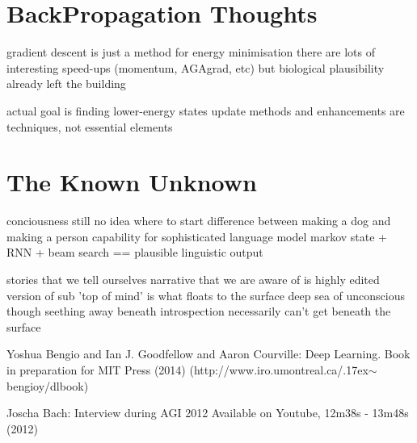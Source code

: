 \documentclass[citeauthoryear]{llncs}
\begin{document}
\section{BackPropagation Thoughts}
  gradient descent is just a method for energy minimisation
    there are lots of interesting speed-ups (momentum, AGAgrad, etc)
      but biological plausibility already left the building
      
    actual goal is finding lower-energy states
      update methods and enhancements are techniques, not essential elements


\section{The Known Unknown}

conciousness 
  still no idea where to start
  difference between making a dog and making a person
    capability for sophisticated language model
      markov state + RNN + beam search == plausible linguistic output
  
  stories that we tell ourselves
    narrative that we are aware of is highly edited version of sub
      'top of mind' is what floats to the surface
      deep sea of unconscious though seething away beneath
  introspection necessarily can't get beneath the surface

%
%
\begin{thebibliography}{}
%
\newcommand{\mytilde}{\raise.17ex\hbox{$\scriptstyle\mathtt{\sim}$}}

Yoshua Bengio and Ian J. Goodfellow and Aaron Courville:
Deep Learning.
Book in preparation for MIT Press (2014)
(http://www.iro.umontreal.ca/\mytilde{}bengioy/dlbook)

Joscha Bach:
Interview during AGI 2012
Available on Youtube, 12m38s - 13m48s (2012)

%
%
%
%

\end{thebibliography}
\end{document}
